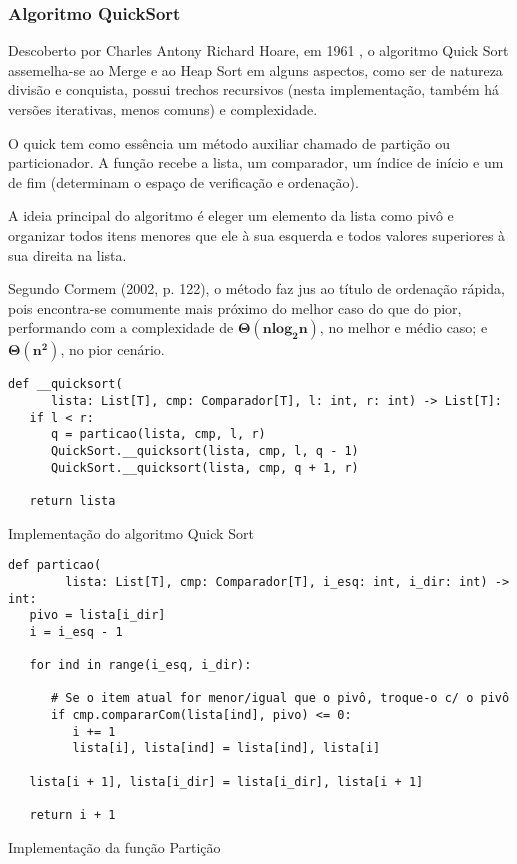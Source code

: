 \documentclass[a4paper,12pt]{scrartcl}
\begin{document}
\subsubsection{Algoritmo QuickSort}
Descoberto por Charles Antony Richard Hoare, em 1961 \cite{hoare}, o algoritmo Quick Sort assemelha-se ao Merge e ao Heap Sort em alguns aspectos, como ser de natureza divisão e conquista, possui trechos recursivos (nesta implementação, também há versões iterativas, menos comuns) e complexidade.

O quick tem como essência um método auxiliar chamado de partição ou particionador. A função  recebe a lista, um comparador, um índice de início e um de fim (determinam o espaço de verificação e ordenação).

A ideia principal do algoritmo é eleger um elemento da lista como pivô e organizar todos itens menores que ele à sua esquerda e todos valores superiores à sua direita na lista.

Segundo Cormem (2002, p. 122), o método faz jus ao título de ordenação rápida, pois encontra-se comumente mais próximo do melhor caso do que do pior, performando com a complexidade de $\pmb{\Theta(n log_2 n)}$, no melhor e médio caso; e $\pmb{\Theta(n^2)}$, no pior cenário.

\begin{listing}[H]
\begin{verbatim}
def __quicksort(
      lista: List[T], cmp: Comparador[T], l: int, r: int) -> List[T]:
   if l < r:
      q = particao(lista, cmp, l, r)
      QuickSort.__quicksort(lista, cmp, l, q - 1)
      QuickSort.__quicksort(lista, cmp, q + 1, r)

   return lista
\end{verbatim}
\caption{\footnotesize{Implementação do algoritmo Quick Sort}}
\end{listing}

\begin{listing}[H]
\begin{verbatim}
def particao(
        lista: List[T], cmp: Comparador[T], i_esq: int, i_dir: int) -> int:
   pivo = lista[i_dir]
   i = i_esq - 1

   for ind in range(i_esq, i_dir):

      # Se o item atual for menor/igual que o pivô, troque-o c/ o pivô
      if cmp.compararCom(lista[ind], pivo) <= 0:
         i += 1
         lista[i], lista[ind] = lista[ind], lista[i]

   lista[i + 1], lista[i_dir] = lista[i_dir], lista[i + 1]

   return i + 1
\end{verbatim}
\caption{\footnotesize{Implementação da função Partição}}
\end{listing}
\end{document}
